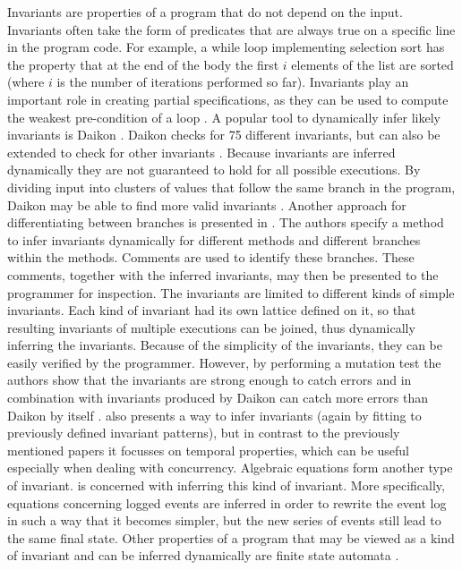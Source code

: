 \documentclass[a4paper, fleqn]{article}
\begin{document}
Invariants are properties of a program that do not depend on the input. Invariants often take the form of predicates that are always true on a specific line in the program code. For example, a while loop implementing selection sort has the property that at the end of the body the first $i$ elements of the list are sorted (where $i$ is the number of iterations performed so far). Invariants play an important role in creating partial specifications, as they can be used to compute the weakest pre-condition of a loop \cite{hoare}. A popular tool to dynamically infer likely invariants is Daikon \cite{daikon}. Daikon checks for 75 different invariants, but can also be extended to check for other invariants \cite{daikon}. Because invariants are inferred dynamically they are not guaranteed to hold for all possible executions. By dividing input into clusters of values that follow the same branch in the program, Daikon may be able to find more valid invariants \cite{clusters}. Another approach for differentiating between branches is presented in \cite{commentinv}. The authors specify a method to infer invariants dynamically for different methods and different branches within the methods. Comments are used to identify these branches. These comments, together with the inferred invariants, may then be presented to the programmer for inspection. The invariants are limited to different kinds of simple invariants. Each kind of invariant had its own lattice defined on it, so that resulting invariants of multiple executions can be joined, thus dynamically inferring the invariants. Because of the simplicity of the invariants, they can be easily verified by the programmer. However, by performing a mutation test the authors show that the invariants are strong enough to catch errors and in combination with invariants produced by Daikon can catch more errors than Daikon by itself \cite{commentinv}. \cite{sequencepred} also presents a way to infer invariants (again by fitting to previously defined invariant patterns), but in contrast to the previously mentioned papers it focusses on temporal properties, which can be useful especially when dealing with concurrency. Algebraic equations form another type of invariant. \cite{algebraicinv} is concerned with inferring this kind of invariant. More specifically, equations concerning logged events are inferred in order to rewrite the event log in such a way that it becomes simpler, but the new series of events still lead to the same final state. Other properties of a program that may be viewed as a kind of invariant and can be inferred dynamically are finite state automata \cite{inferautomaton}.
\end{document}
